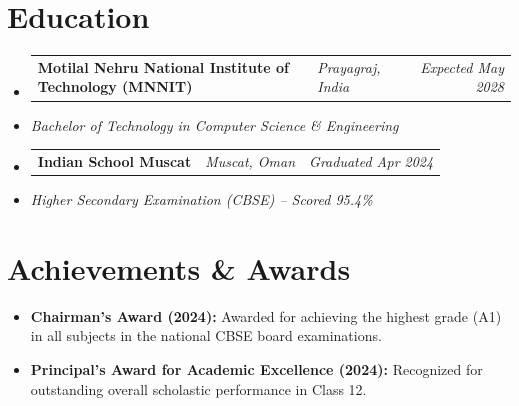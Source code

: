 \documentclass[10pt, letterpaper]{article}
\makeatletter
\newcommand{\resumeSubheading}[3]{%
    \item
    \begin{tabularx}{\textwidth}{@{}l X r@{}}
        \textbf{#1} & \textit{\small #2} & \textit{\small #3}
    \end{tabularx}%
}
\makeatother
\begin{document}
\section*{Education}
\begin{itemize}
    \resumeSubheading
        {Motilal Nehru National Institute of Technology (MNNIT)}
        {Prayagraj, India}
        {Expected May 2028}
    \item[] \textit{Bachelor of Technology in Computer Science \& Engineering}
    
    \resumeSubheading
        {Indian School Muscat}
        {Muscat, Oman}
        {Graduated Apr 2024}
    \item[] \textit{Higher Secondary Examination (CBSE) -- Scored 95.4\%}
\end{itemize}

\section*{Achievements \& Awards}
\begin{itemize}[label={}]
    \item \textbf{Chairman's Award (2024):} Awarded for achieving the highest grade (A1) in all subjects in the national CBSE board examinations.
    \item \textbf{Principal's Award for Academic Excellence (2024):} Recognized for outstanding overall scholastic performance in Class 12.
\end{itemize}
\end{document}
